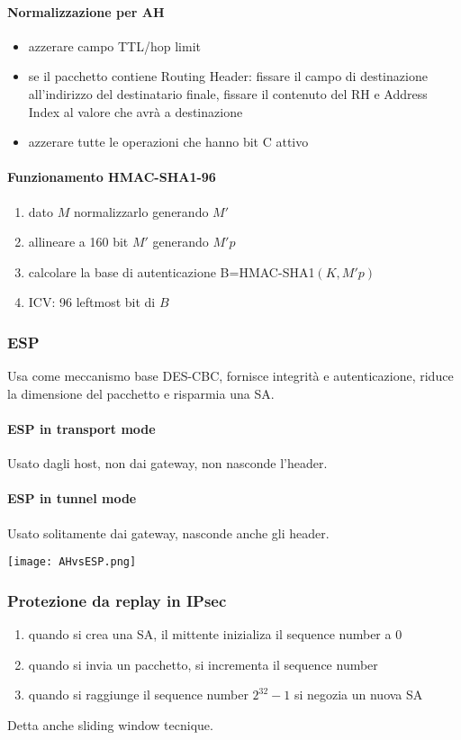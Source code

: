 \documentclass[11pt]{article}
\begin{document}
\paragraph*{Normalizzazione per AH}
\begin{itemize}
    \item azzerare campo TTL/hop limit 
    \item se il pacchetto contiene Routing Header: fissare il campo di destinazione all'indirizzo del destinatario finale, 
    fissare il contenuto del RH e Address Index al valore che avrà a destinazione
    \item azzerare tutte le operazioni che hanno bit C attivo 
\end{itemize}
\paragraph*{Funzionamento HMAC-SHA1-96}
\begin{enumerate}
    \item dato $M$ normalizzarlo generando $M'$
    \item allineare a 160 bit $M'$ generando $M'p$
    \item calcolare la base di autenticazione B=HMAC-SHA1$(K,M'p)$
    \item ICV: 96 leftmost bit di $B$
\end{enumerate}
\subsubsection{ESP}
Usa come meccanismo base DES-CBC, fornisce integrità e autenticazione, riduce la dimensione del pacchetto e risparmia una 
SA.
\paragraph*{ESP in transport mode}
Usato dagli host, non dai gateway, non nasconde l'header.
\paragraph*{ESP in tunnel mode}
Usato solitamente dai gateway, nasconde anche gli header.
\begin{center}
    \texttt{[image: AHvsESP.png]}
\end{center}
\subsubsection{Protezione da replay in IPsec}
\begin{enumerate}
    \item quando si crea una SA, il mittente inizializa il sequence number a 0
    \item quando si invia un pacchetto, si incrementa il sequence number 
    \item quando si raggiunge il sequence number $2^{32}-1$ si negozia un nuova SA
\end{enumerate}
Detta anche sliding window tecnique.
\end{document}
